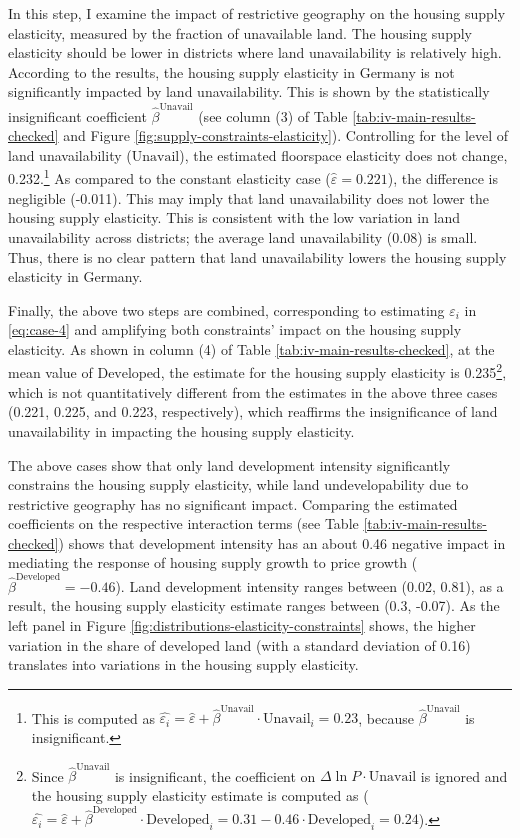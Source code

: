\documentclass[
  12pt,
]{article}
\begin{document}
In this step, I examine the impact of restrictive geography on the housing supply elasticity, measured by the fraction of unavailable land. The housing supply elasticity should be lower in districts where land unavailability is relatively high. According to the results, the housing supply elasticity in Germany is not significantly impacted by land unavailability. This is shown by the statistically insignificant coefficient \(\widehat{\beta}^{\text{Unavail}}\) (see column (3) of Table \ref{tab:iv-main-results-checked} and Figure \ref{fig:supply-constraints-elasticity}). Controlling for the level of land unavailability (\(\text{Unavail}\)), the estimated floorspace elasticity does not change, 0.232.\footnote{This is computed as \(\widehat{\varepsilon_i} =\widehat{\varepsilon} + \widehat{\beta}^{\text{Unavail}}\cdot\text{Unavail}_i = 0.23\), because \(\widehat{\beta}^{\text{Unavail}}\) is insignificant.} As compared to the constant elasticity case (\(\widehat{\varepsilon}=0.221\)), the difference is negligible (-0.011). This may imply that land unavailability does not lower the housing supply elasticity. This is consistent with the low variation in land unavailability across districts; the average land unavailability (0.08) is small. Thus, there is no clear pattern that land unavailability lowers the housing supply elasticity in Germany.

Finally, the above two steps are combined, corresponding to estimating \(\varepsilon_i\) in \eqref{eq:case-4} and amplifying both constraints' impact on the housing supply elasticity. As shown in column (4) of Table \ref{tab:iv-main-results-checked}, at the mean value of \(\text{Developed}\), the estimate for the housing supply elasticity is 0.235\footnote{Since \(\widehat{\beta}^{\text{Unavail}}\) is insignificant, the coefficient on \(\Delta\ln P\cdot\text{Unavail}\) is ignored and the housing supply elasticity estimate is computed as (\(\widehat{\varepsilon_i} = \widehat{\varepsilon} + \widehat{\beta}^{\text{Developed}}\cdot\text{Developed}_i = 0.31 -0.46 \cdot\text{Developed}_i = 0.24\)).}, which is not quantitatively different from the estimates in the above three cases (0.221, 0.225, and 0.223, respectively), which reaffirms the insignificance of land unavailability in impacting the housing supply elasticity.

The above cases show that only land development intensity significantly constrains the housing supply elasticity, while land undevelopability due to restrictive geography has no significant impact. Comparing the estimated coefficients on the respective interaction terms (see Table \ref{tab:iv-main-results-checked}) shows that development intensity has an about 0.46 negative impact in mediating the response of housing supply growth to price growth (\(\widehat{\beta}^{\text{Developed}} = -0.46\)). Land development intensity ranges between (0.02, 0.81), as a result, the housing supply elasticity estimate ranges between (0.3, -0.07). As the left panel in Figure \ref{fig:distributions-elasticity-constraints} shows, the higher variation in the share of developed land (with a standard deviation of 0.16) translates into variations in the housing supply elasticity.
\end{document}
